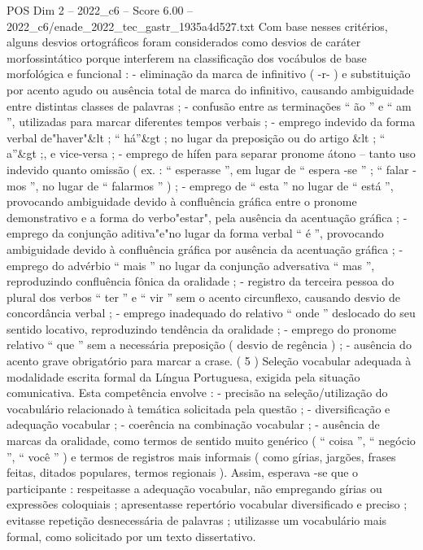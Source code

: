 \begin{textsample}{POS Dim 2 – 2022\_c6 – Score 6.00 – 2022\_c6/enade\_2022\_tec\_gastr\_1935a4d527.txt}
Com base nesses critérios, alguns desvios ortográficos foram considerados como desvios de caráter morfossintático porque interferem na classificação dos vocábulos de base morfológica e funcional : - eliminação da marca de infinitivo ( -r- ) e substituição por acento agudo ou ausência total de marca do infinitivo, causando ambiguidade entre distintas classes de palavras ; - confusão entre as terminações “ ão ” e “ am ”, utilizadas para marcar diferentes tempos verbais ; - emprego indevido da forma verbal de"haver"\&lt ; “ há”\&gt ; no lugar da preposição ou do artigo \&lt ; “ a”\&gt ;, e vice-versa ; - emprego de hífen para separar pronome átono – tanto uso indevido quanto omissão ( ex. : “ esperasse ”, em lugar de “ espera -se ” ; “ falar -mos ”, no lugar de “ falarmos ” ) ; - emprego de “ esta ” no lugar de “ está ”, provocando ambiguidade devido à confluência gráfica entre o pronome demonstrativo e a forma do verbo"estar", pela ausência da acentuação gráfica ; - emprego da conjunção aditiva"e"no lugar da forma verbal “ é ”, provocando ambiguidade devido à confluência gráfica por ausência da acentuação gráfica ; - emprego do advérbio “ mais ” no lugar da conjunção adversativa “ mas ”, reproduzindo confluência fônica da oralidade ; - registro da terceira pessoa do plural dos verbos “ ter ” e “ vir ” sem o acento circunflexo, causando desvio de concordância verbal ; - emprego inadequado do relativo “ onde ” deslocado do seu sentido locativo, reproduzindo tendência da oralidade ; - emprego do pronome relativo “ que ” sem a necessária preposição ( desvio de regência ) ; - ausência do acento grave obrigatório para marcar a crase. ( 5 ) Seleção vocabular adequada à modalidade escrita formal da Língua Portuguesa, exigida pela situação comunicativa.
Esta competência envolve : - precisão na seleção/utilização do vocabulário relacionado à temática solicitada pela questão ; - diversificação e adequação vocabular ; - coerência na combinação vocabular ; - ausência de marcas da oralidade, como termos de sentido muito genérico ( “ coisa ”, “ negócio ”, “ você ” ) e termos de registros mais informais ( como gírias, jargões, frases feitas, ditados populares, termos regionais ).
Assim, esperava -se que o participante : respeitasse a adequação vocabular, não empregando gírias ou expressões coloquiais ; apresentasse repertório vocabular diversificado e preciso ; evitasse repetição desnecessária de palavras ; utilizasse um vocabulário mais formal, como solicitado por um texto dissertativo.

\end{textsample}
